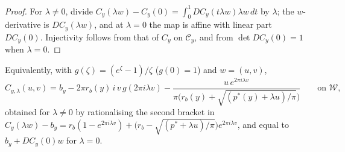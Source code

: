 \begin{proof}
For $\lambda\ne0$, divide $C_y(\lambda w)-C_y(0)=\int_0^1DC_y(t\lambda w)\lambda w\,dt$ by $\lambda$; the $w$-derivative is $DC_y(\lambda w)$, and at $\lambda=0$ the map is affine with linear part $DC_y(0)$. Injectivity follows from that of $C_y$ on $\mathcal C_y$, and from $\det DC_y(0)=1$ when $\lambda=0$.
\end{proof}

Equivalently, with $g(\zeta)=(e^\zeta-1)/\zeta$ ($g(0)=1$) and $w=(u,v)$,
\[
 C_{y,\lambda}(u,v)=b_y-2\pi r_b(y)\,i\,v\,g(2\pi i\lambda v)-\frac{u\,e^{2\pi i\lambda v}}{\pi\bigl(r_b(y)+\sqrt{(p^*(y)+\lambda u)/\pi}\bigr)}
 \qquad\text{on }\mathcal W ,
\]
obtained for $\lambda\ne0$ by rationalising the second bracket in $C_y(\lambda w)-b_y=r_b(1-e^{2\pi i\lambda v})+\bigl(r_b-\sqrt{(p^*+\lambda u)/\pi}\bigr)e^{2\pi i\lambda v}$, and equal to $b_y+DC_y(0)w$ for $\lambda=0$.

